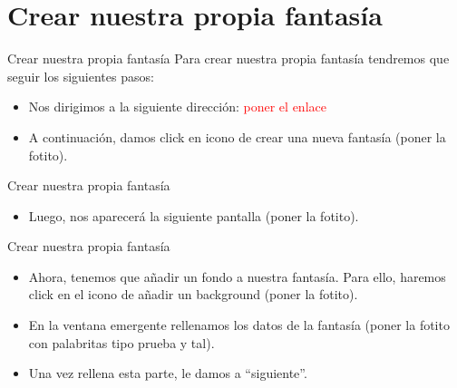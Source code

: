 \documentclass[aspectratio=169]{beamer}
\begin{document}
\section{Crear nuestra propia fantasía}
\begin{frame}{Crear nuestra propia fantasía}
Para crear nuestra propia fantasía tendremos que seguir los siguientes pasos:
\begin{itemize}
	\item Nos dirigimos a la siguiente dirección: \textcolor{red}{poner el enlace}
	\item A continuación, damos click en icono de crear una nueva fantasía (poner la fotito).
\end{itemize}
\end{frame}

\begin{frame}{Crear nuestra propia fantasía}
\begin{itemize}
	\item Luego, nos aparecerá la siguiente pantalla (poner la fotito).
\end{itemize}
\end{frame}

\begin{frame}{Crear nuestra propia fantasía}
\begin{itemize}
	\item Ahora, tenemos que añadir un fondo a nuestra fantasía. Para ello, haremos click en el icono de añadir un background (poner la fotito).
	\item En la ventana emergente rellenamos los datos de la fantasía (poner la fotito con palabritas tipo prueba y tal).
	\item Una vez rellena esta parte, le damos a ``siguiente''.
\end{itemize}
\end{frame}
\end{document}
